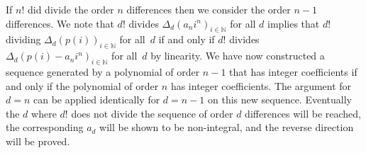 \begin{parts}
\begin{solution}
		If $n!$ did divide the order $n$ differences then we consider the order $n - 1$ differences. We note that $d!$ divides $\Delta_d (a_n i^n)_{i \in \mathbb{N}}$ for all $d$ implies that $d!$ dividing $\Delta_d (p(i))_{i \in \mathbb{N}}$ for all~$d$ if and only if $d!$ divides $\Delta_d (p(i) - a_n i^n)_{i \in \mathbb{N}}$ for all~$d$ by linearity. We have now constructed a sequence generated by a polynomial of order $n - 1$ that has integer coefficients if and only if the polynomial of order $n$ has integer coefficients. The argument for $d = n$ can be applied identically for $d = n - 1$ on this new sequence. Eventually the $d$ where $d!$ does not divide the sequence of order $d$ differences will be reached, the corresponding $a_d$ will be shown to be non-integral, and the reverse direction will be proved.
		
	\end{solution}

	\fi

\end{parts}